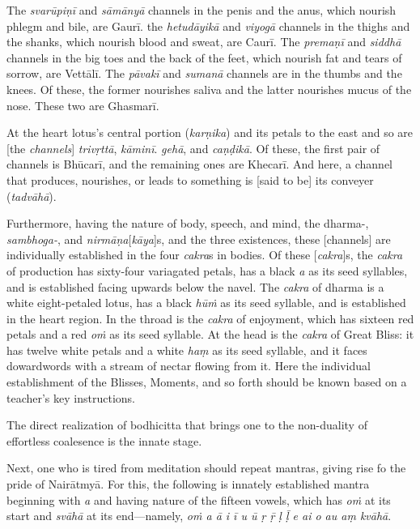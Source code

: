 \documentclass[naipra.tex]{subfiles}
\begin{document}
The \emph{svarūpiṇī} and \emph{sāmānyā} channels in the penis and the anus, which nourish phlegm and bile, are Gaurī.
the \emph{hetudāyikā} and \emph{viyogā} channels in the thighs and the shanks, which nourish blood and sweat, are Caurī.
The \emph{premaṇī} and \emph{siddhā} channels in the big toes and the back of the feet, which nourish fat and tears of sorrow, are Vettālī.
The \emph{pāvakī} and \emph{sumanā} channels are in the thumbs and the knees.
Of these, the former nourishes saliva and the latter nourishes mucus of the nose.
These two are Ghasmarī.

At the heart lotus's central portion (\emph{karṇika}) and its petals to the east and so are [the \emph{channels}] \emph{trivṛttā}, \emph{kāminī}. \emph{gehā}, and \emph{caṇḍikā}.
Of these, the first pair of channels is Bhūcarī, and the remaining ones are Khecarī.
And here, a channel that produces, nourishes, or leads to something is [said to be] its conveyer (\emph{tadvāhā}).

Furthermore, having the nature of body, speech, and mind, the dharma-, \emph{sambhoga-}, and \emph{nirmāṇa}[\emph{kāya}]s, and the three existences, these [channels] are individually established in the four \emph{cakra}s in bodies.
Of these [\emph{cakra}]s, the \emph{cakra} of production has sixty-four variagated petals, has a black \emph{a} as its seed syllables, and is established facing upwards below the navel.
The \emph{cakra} of dharma is a white eight-petaled lotus, has a black \emph{hūṁ} as its seed syllable, and is established in the heart region.
In the throad is the \emph{cakra} of enjoyment, which has sixteen red petals and a red \emph{oṁ} as its seed syllable.
At the head is the \emph{cakra} of Great Bliss: it has twelve white petals and a white \emph{haṃ} as its seed syllable, and it faces dowardwords with a stream of nectar flowing from it.
Here the individual establishment of the Blisses, Moments, and so forth should be known based on a teacher's key instructions.

The direct realization of bodhicitta that brings one to the non-duality of effortless coalesence is the innate stage. 

Next, one who is tired from meditation should repeat mantras, giving rise fo the pride of Nairātmyā.
For this, the following is innately established mantra beginning with \emph{a} and having nature of the fifteen vowels, which has \emph{oṁ} at its start and \emph{svāhā} at its end—namely, \emph{oṁ a ā i ī u ū ṛ ṝ ḷ ḹ e ai o au aṃ kvāhā}.
\end{document}
